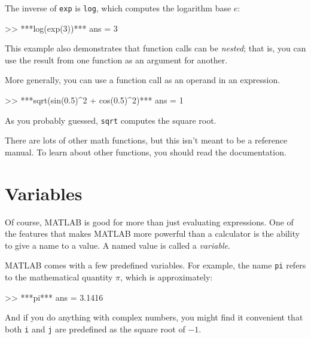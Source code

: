 
The inverse of \lstinline{exp} is \lstinline{log}, which computes the logarithm base $e$:

\begin{code}
>> ***log(exp(3))***
ans = 3
\end{code}

This example also demonstrates that function calls can be \emph{nested};
that is, you can use the result from one function as an argument for
another.


More generally, you can use a function call as an operand in an expression.

\begin{code}
>> ***sqrt(sin(0.5)^2 + cos(0.5)^2)***
ans = 1
\end{code}

As you probably guessed, \lstinline{sqrt} computes the square root.


There are lots of other math functions, but this isn't meant to
be a reference manual.  To learn about other functions, you should
read the documentation.


\section{Variables}

Of course, MATLAB is good for more than just evaluating expressions. One of the features that makes MATLAB more powerful than a calculator is the ability to give a name to a value.  A named value is called a \emph{variable}.

 
MATLAB comes with a few predefined variables. For
example, the name \lstinline{pi} refers to the
mathematical quantity $\pi$, which is approximately:

\begin{code}
>> ***pi***
ans = 3.1416
\end{code}

And if you do anything with complex numbers, you might find it
convenient that both \lstinline{i} and \lstinline{j} are predefined as the square
root of $-1$.


